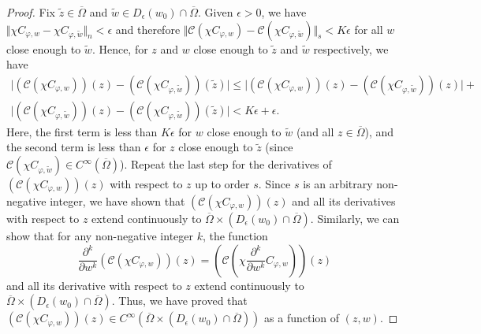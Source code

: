 \documentclass[11pt, reqno]{amsart}
\numberwithin{equation}{section}
\begin{document}
\begin{proof}
Fix $\tilde{z}\in\overline{\Omega}$ and  $\tilde{w}\in D_{\epsilon}(w_0)\cap \overline{\Omega}$.
Given $\epsilon>0$, we have $\Vert\chi C_{\varphi,w}-\chi C_{\varphi,\tilde{w}}\Vert_n<\epsilon$ and therefore $\Vert\mathcal{C}(\chi C_{\varphi,w})-\mathcal{C}(\chi C_{\varphi,\tilde{w}})\Vert_s<K\epsilon$ for all $w$ close enough to $\tilde{w}$. Hence, for $z$ and $w$ close enough to $\tilde{z}$ and $\tilde{w}$ respectively, we have
\begin{multline*}
\vert (\mathcal{C}(\chi C_{\varphi,w}))(z)-(\mathcal{C}(\chi C_{\varphi,\tilde{w}}))(\tilde{z})\vert 
\leq
\vert (\mathcal{C}(\chi C_{\varphi,w}))(z)-(\mathcal{C}(\chi C_{\varphi,\tilde{w}}))(z)\vert
+
\\
\vert (\mathcal{C}(\chi C_{\varphi,\tilde{w}}))(z)-(\mathcal{C}(\chi C_{\varphi,\tilde{w}}))(\tilde{z})\vert
< K\epsilon +\epsilon.
\end{multline*}
Here, the first term is less than $K\epsilon$ for $w$ close enough to $\tilde{w}$ (and all $z\in\overline{\Omega}$), and the second term is less than $\epsilon$ for $z$ close enough to $\tilde{z}$ (since $\mathcal{C}(\chi C_{\varphi,\tilde{w}})\in C^{\infty}(\overline{\Omega})$). Repeat the last step for the derivatives of $(\mathcal{C}(\chi C_{\varphi,w}))(z)$ with respect to $z$ up to order $s$. Since $s$ is an arbitrary non-negative integer, we have shown that $(\mathcal{C}(\chi C_{\varphi,w}))(z)$ and all its derivatives with respect to $z$ extend continuously to $\overline{\Omega}\times (D_{\epsilon}(w_0)\cap\overline{\Omega})$. Similarly, we can show that for any non-negative integer $k$, the function
\[
\frac{\partial^k}{\partial w^k}(\mathcal{C}(\chi C_{\varphi,w}))(z)=\left(\mathcal{C}\left(\chi \frac{\partial^k}{\partial w^k}C_{\varphi,w}\right)\right)(z)
\]
and all its derivative with respect to $z$ extend continuously to $\overline{\Omega}\times (D_{\epsilon}(w_0)\cap\overline{\Omega})$. Thus, we have proved that $(\mathcal{C}(\chi C_{\varphi,w}))(z)\in C^{\infty}(\overline{\Omega}\times (D_{\epsilon}(w_0)\cap\overline{\Omega}))$ as a function of $(z,w)$. 

\medskip 


\end{proof}
\end{document}

